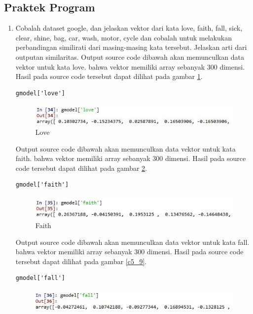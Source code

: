\subsection{Praktek Program}
\begin{enumerate}
\item Cobalah dataset google, dan jelaskan vektor dari kata love, faith, fall, sick, clear, shine, bag, car, wash, motor, cycle dan cobalah untuk melakukan perbandingan similirati dari masing-masing kata tersebut. Jelaskan arti dari outputan similaritas.
\subitem Output source code dibawah akan memunculkan data vektor untuk kata love. bahwa vektor memiliki array sebanyak 300 dimensi. Hasil pada source code tersebut dapat dilihat pada gambar \ref{c5_7}.
\begin{verbatim}
gmodel['love']
\end{verbatim}
\begin{figure}[ht]
	\centerline{\includegraphics[width=1\textwidth]{figures/huda/chapter5/7.JPG}}
	\caption{Love}
	\label{c5_7}
\end{figure}
\subitem Output source code dibawah akan memunculkan data vektor untuk kata faith. bahwa vektor memiliki array sebanyak 300 dimensi. Hasil pada source code tersebut dapat dilihat pada gambar \ref{c5_8}.
\begin{verbatim}
gmodel['faith']
\end{verbatim}
\begin{figure}[ht]
	\centerline{\includegraphics[width=1\textwidth]{figures/huda/chapter5/8.JPG}}
	\caption{Faith}
	\label{c5_8}
\end{figure}
\subitem Output source code dibawah akan memunculkan data vektor untuk kata fall. bahwa vektor memiliki array sebanyak 300 dimensi. Hasil pada source code tersebut dapat dilihat pada gambar \ref{c5_9}.
\begin{verbatim}
gmodel['fall']
\end{verbatim}
\begin{figure}[ht]
	\centerline{\includegraphics[width=1\textwidth]{figures/huda/chapter5/9.JPG}}

\end{figure}
\end{enumerate}
